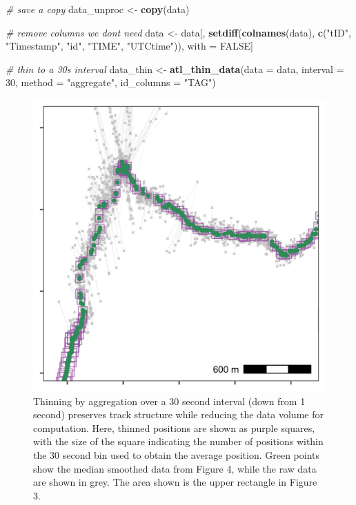 \documentclass[
]{scrartcl}
\newenvironment{Shaded}{}{}
\newcommand{\CommentTok}[1]{\textcolor[rgb]{0.38,0.63,0.69}{\textit{#1}}}
\newcommand{\DataTypeTok}[1]{\textcolor[rgb]{0.56,0.13,0.00}{#1}}
\newcommand{\DecValTok}[1]{\textcolor[rgb]{0.25,0.63,0.44}{#1}}
\newcommand{\KeywordTok}[1]{\textcolor[rgb]{0.00,0.44,0.13}{\textbf{#1}}}
\newcommand{\NormalTok}[1]{#1}
\newcommand{\OtherTok}[1]{\textcolor[rgb]{0.00,0.44,0.13}{#1}}
\newcommand{\StringTok}[1]{\textcolor[rgb]{0.25,0.44,0.63}{#1}}
\begin{document}
\begin{Shaded}
\begin{Highlighting}[]
\CommentTok{\# save a copy}
\NormalTok{data\_unproc <{-}}\StringTok{ }\KeywordTok{copy}\NormalTok{(data)}

\CommentTok{\# remove columns we don\textquotesingle{}t need}
\NormalTok{data <{-}}\StringTok{ }\NormalTok{data[, }\KeywordTok{setdiff}\NormalTok{(}\KeywordTok{colnames}\NormalTok{(data), }
                       \KeywordTok{c}\NormalTok{(}\StringTok{"tID"}\NormalTok{, }\StringTok{"Timestamp"}\NormalTok{, }\StringTok{"id"}\NormalTok{, }\StringTok{"TIME"}\NormalTok{, }\StringTok{"UTCtime"}\NormalTok{)), }
\NormalTok{             with =}\StringTok{ }\OtherTok{FALSE}\NormalTok{]}

\CommentTok{\# thin to a 30s interval}
\NormalTok{data\_thin <{-}}\StringTok{ }\KeywordTok{atl\_thin\_data}\NormalTok{(}\DataTypeTok{data =}\NormalTok{ data,}
                           \DataTypeTok{interval =} \DecValTok{30}\NormalTok{,}
                           \DataTypeTok{method =} \StringTok{"aggregate"}\NormalTok{,}
                           \DataTypeTok{id\_columns =} \StringTok{"TAG"}\NormalTok{)}
\end{Highlighting}
\end{Shaded}

\begin{figure}
\centering
\includegraphics{figures/fig_calib_smooth_thin.png}
\caption{Thinning by aggregation over a 30 second interval (down from 1 second) preserves track structure while reducing the data volume for computation. Here, thinned positions are shown as purple squares, with the size of the square indicating the number of positions within the 30 second bin used to obtain the average position. Green points show the median smoothed data from Figure 4, while the raw data are shown in grey. The area shown is the upper rectangle in Figure 3.}
\end{figure}
\end{document}

